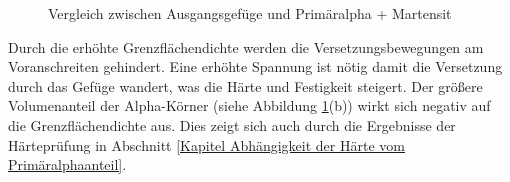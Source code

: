\documentclass[a4paper, 11pt]{tubsreprt}
\begin{document}
\begin{figure}
\caption{Vergleich zwischen Ausgangsgefüge und Primäralpha + Martensit}
\label{Vergleich Primäralpha martensit}
\end{figure}


Durch die erhöhte Grenzflächendichte werden die Versetzungsbewegungen am Voranschreiten gehindert. Eine erhöhte Spannung ist nötig damit die Versetzung durch das Gefüge wandert, was die Härte und Festigkeit steigert. Der größere Volumenanteil der Alpha-Körner (siehe Abbildung \ref{Vergleich Primäralpha martensit}(b)) wirkt sich negativ auf die Grenzflächendichte aus. Dies zeigt sich auch durch die Ergebnisse der Härteprüfung in Abschnitt \ref{Kapitel Abhängigkeit der Härte vom Primäralphaanteil}. 


\newpage
\ \\
\newpage
\end{document}
